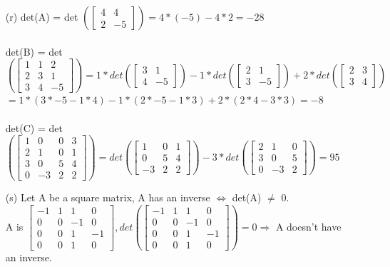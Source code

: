\documentclass[a4paper]{article}
\begin{document}
\begin{itemize}
\item[(r)] det(A) = det
$
(
\begin{bmatrix} 
4 & 4\\
2 & -5 
\end{bmatrix}
) = 4*(-5) - 4*2 = -28
$\\\\
det(B) = det
$
(
\begin{bmatrix} 
1 & 1 & 2\\
2 & 3 & 1\\
3 & 4 & -5
\end{bmatrix}
) = 
1 * det(
\begin{bmatrix} 
3 & 1\\
4 & -5 
\end{bmatrix}
)
-1* det(
\begin{bmatrix} 
2 & 1\\
3 & -5 
\end{bmatrix}
) + 
2 * det(
\begin{bmatrix} 
2 & 3\\
3 & 4 
\end{bmatrix}
)
$\\
$=
1 *(3 * −5 − 1 * 4) − 1 *(2 * −5 − 1 * 3) + 2 * (2 * 4 − 3 * 3) = -8
$\\\\
det(C) = det
$
(
\begin{bmatrix} 
1 & 0 & 0 & 3\\
2 & 1 & 0 & 1\\
3 & 0 & 5 & 4\\
0 & -3 & 2 & 2
\end{bmatrix}
)
= 
det(
\begin{bmatrix} 
1 & 0 & 1\\
0 & 5 & 4\\
-3 & 2 & 2
\end{bmatrix}
)
-3 * det(
\begin{bmatrix} 
2 & 1 & 0 \\
3 & 0 & 5 \\
0 & -3 & 2
\end{bmatrix}
) = 95
$
\item[(s)] Let A be a square matrix, A has an inverse $\Leftrightarrow$ det(A) $\neq$ 0.\\
A is
$
\begin{bmatrix} 
-1 & 1 & 1 & 0 \\
0 & 0 & -1 & 0 \\
0 & 0 & 1 & -1 \\
0 & 0 & 1 & 0 
\end{bmatrix},
det(
\begin{bmatrix} 
-1 & 1 & 1 & 0 \\
0 & 0 & -1 & 0 \\
0 & 0 & 1 & -1 \\
0 & 0 & 1 & 0 
\end{bmatrix}
)= 0 \Rightarrow
$ A doesn't have an inverse.
\end{itemize}
\end{document}
